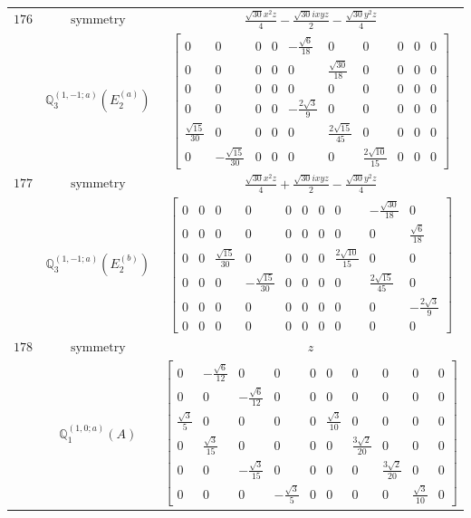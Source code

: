 \documentclass[fleqn,8pt,landscape]{jsarticle}
\begin{document}
\begin{longtable}{ccc}
$ 176 $ & $ \text{symmetry} $ & $ \frac{\sqrt{30} x^{2} z}{4} - \frac{\sqrt{30} i x y z}{2} - \frac{\sqrt{30} y^{2} z}{4} $ \\
$  $ & $ \mathbb{Q}_{3}^{(1,-1;a)}(E_{2}^{(a)}) $ & $ \begin{bmatrix} 0 & 0 & 0 & 0 & - \frac{\sqrt{6}}{18} & 0 & 0 & 0 & 0 & 0 \\ 0 & 0 & 0 & 0 & 0 & \frac{\sqrt{30}}{18} & 0 & 0 & 0 & 0 \\ 0 & 0 & 0 & 0 & 0 & 0 & 0 & 0 & 0 & 0 \\ 0 & 0 & 0 & 0 & - \frac{2 \sqrt{3}}{9} & 0 & 0 & 0 & 0 & 0 \\ \frac{\sqrt{15}}{30} & 0 & 0 & 0 & 0 & \frac{2 \sqrt{15}}{45} & 0 & 0 & 0 & 0 \\ 0 & - \frac{\sqrt{15}}{30} & 0 & 0 & 0 & 0 & \frac{2 \sqrt{10}}{15} & 0 & 0 & 0 \end{bmatrix} $ \\ \hline
$ 177 $ & $ \text{symmetry} $ & $ \frac{\sqrt{30} x^{2} z}{4} + \frac{\sqrt{30} i x y z}{2} - \frac{\sqrt{30} y^{2} z}{4} $ \\
$  $ & $ \mathbb{Q}_{3}^{(1,-1;a)}(E_{2}^{(b)}) $ & $ \begin{bmatrix} 0 & 0 & 0 & 0 & 0 & 0 & 0 & 0 & - \frac{\sqrt{30}}{18} & 0 \\ 0 & 0 & 0 & 0 & 0 & 0 & 0 & 0 & 0 & \frac{\sqrt{6}}{18} \\ 0 & 0 & \frac{\sqrt{15}}{30} & 0 & 0 & 0 & 0 & \frac{2 \sqrt{10}}{15} & 0 & 0 \\ 0 & 0 & 0 & - \frac{\sqrt{15}}{30} & 0 & 0 & 0 & 0 & \frac{2 \sqrt{15}}{45} & 0 \\ 0 & 0 & 0 & 0 & 0 & 0 & 0 & 0 & 0 & - \frac{2 \sqrt{3}}{9} \\ 0 & 0 & 0 & 0 & 0 & 0 & 0 & 0 & 0 & 0 \end{bmatrix} $ \\ \hline
$ 178 $ & $ \text{symmetry} $ & $ z $ \\
$  $ & $ \mathbb{Q}_{1}^{(1,0;a)}(A) $ & $ \begin{bmatrix} 0 & - \frac{\sqrt{6}}{12} & 0 & 0 & 0 & 0 & 0 & 0 & 0 & 0 \\ 0 & 0 & - \frac{\sqrt{6}}{12} & 0 & 0 & 0 & 0 & 0 & 0 & 0 \\ \frac{\sqrt{3}}{5} & 0 & 0 & 0 & 0 & \frac{\sqrt{3}}{10} & 0 & 0 & 0 & 0 \\ 0 & \frac{\sqrt{3}}{15} & 0 & 0 & 0 & 0 & \frac{3 \sqrt{2}}{20} & 0 & 0 & 0 \\ 0 & 0 & - \frac{\sqrt{3}}{15} & 0 & 0 & 0 & 0 & \frac{3 \sqrt{2}}{20} & 0 & 0 \\ 0 & 0 & 0 & - \frac{\sqrt{3}}{5} & 0 & 0 & 0 & 0 & \frac{\sqrt{3}}{10} & 0 \end{bmatrix} $ \\ \hline

\end{longtable}
\end{document}
